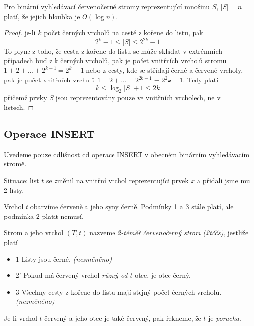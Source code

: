 
\begin{theorem} %
Pro binární vyhledávací červenočerné stromy reprezentující množinu $S$,
$|S| = n$ platí, že jejich hloubka je $O(\log n)$.
\end{theorem}

\begin{proof}
je-li $k$ počet černých vrcholů na cestě z kořene do listu, pak
\[
2^k -1 \leq |S| \leq 2^{2k} -1
\]
To plyne z toho, že cesta z kořene do listu se může skládat v extrémních
případech buď z k černých vrcholů, pak je počet vnitřních vrcholů stromu
$1 + 2 + ... + 2^{k-1} = 2^k - 1$ nebo z cesty, kde se střídají černé a
červené vrcholy, pak je počet vnitřních vrcholů $1 + 2 + ... + 2^{2k-1} =
2^2k - 1$.
Tedy platí
\[
k \leq \log_2 |S| +1 \leq 2k
\]
přičemž prvky $S$ jsou reprezentovány pouze ve vnitřních vrcholech, ne
v listech. 
\end{proof}


\subsection{Operace INSERT}
Uvedeme pouze odlišnost od operace INSERT v obecném binárním
vyhledávacím stromě.

Situace: list $t$ se změnil na vnitřní vrchol reprezentující prvek $x$
a přidali jsme mu 2 listy.

Vrchol $t$ obarvíme červeně a jeho syny černě. Podmínky 1 a 3 stále
platí, ale podmínka 2 platit nemusí.
\begin{defn}
Strom a jeho vrchol $(T,t)$ nazveme \emph{2-téměř červenočerný strom
(2tččs),} jestliže platí
\begin{itemize}
\item{1} Listy jsou černé. {\it (nezměněno)}
\item{2'} Pokud má červený vrchol \emph{různý od $t$} otce, je otec
černý.
\item{3} Všechny cesty z kořene do listu mají stejný počet černých
vrcholů. {\it (nezměněno)}
\end{itemize}
\end{defn}

\begin{defn}
Je-li vrchol $t$ červený a jeho otec je také červený, pak řekneme, že
$t$ je \emph{porucha}.
\end{defn}

